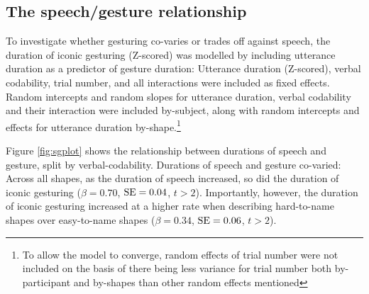 \documentclass[a4paper,man,natbib]{apa6}
\newcommand{\resultsLM}[3]{$\beta = #1$, $\textnormal{SE} = #2$, $t #3$}
\begin{document}
\subsection{The speech/gesture relationship}
To investigate whether gesturing co-varies or trades off against speech, the duration of iconic gesturing (Z-scored) was modelled by including utterance duration as a predictor of gesture duration: Utterance duration (Z-scored), verbal codability, trial number, and all interactions were included as fixed effects. 
Random intercepts and random slopes for utterance duration, verbal codability and their interaction were included by-subject, along with random intercepts and effects for utterance duration by-shape.\footnote{To allow the model to converge, random effects of trial number were not included on the basis of there being less variance for trial number both by-participant and by-shapes than other random effects mentioned}

Figure \ref{fig:sgplot} shows the relationship between durations of speech and gesture, split by verbal-codability.
Durations of speech and gesture co-varied: Across all shapes, as the duration of speech increased, so did the duration of iconic gesturing (\resultsLM{0.70}{0.04}{>2}).
Importantly, however, the duration of iconic gesturing increased at a higher rate when describing hard-to-name shapes over easy-to-name shapes (\resultsLM{0.34}{0.06}{>2}).
\end{document}
